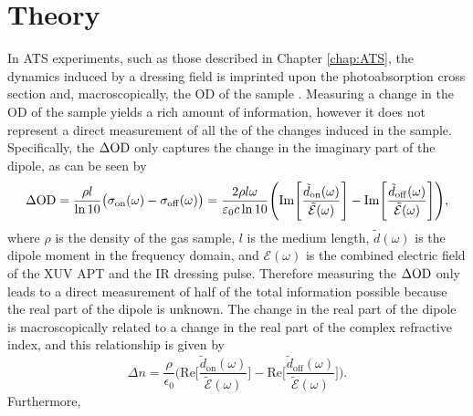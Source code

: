 \section{Theory}
\label{sec:ats_theory}
In ATS experiments, such as those described in Chapter \ref{chap:ATS}, the dynamics induced by a dressing field is imprinted upon the photoabsorption cross section and, macroscopically, the OD of the sample \cite{wuTheoryStrongfieldAttosecond2016,geneauxromainTransientAbsorptionSpectroscopy2019}.  Measuring a change in the OD of the sample yields a rich amount of information, however it does not represent a direct measurement of all the of the changes induced in the sample.  Specifically, the $\Delta\mathrm{OD}$ only captures the change in the imaginary part of the dipole, as can be seen by
\begin{equation}
	\label{eqn:dod_im_dipole}
	\Delta\mathrm{OD} = \frac{\rho l}{\ln 10}\big(\sigma_{\mathrm{on}}(\omega) - \sigma_{\mathrm{off}}(\omega)\big) = \frac{2\rho l \omega}{\varepsilon_{0} c \ln 10}\Bigg( \mathrm{Im}\Bigg[\frac{\tilde{d}_{\mathrm{on}}(\omega)}{\tilde{\mathcal{E}}(\omega)}\Bigg] - \mathrm{Im}\Bigg[\frac{\tilde{d}_{\mathrm{off}}(\omega)}{\tilde{\mathcal{E}}(\omega)}\Bigg] \Bigg),
\end{equation}
where $\rho$ is the density of the gas sample, $l$ is the medium length, $\tilde{d}(\omega)$ is the dipole moment in the frequency domain, and $\mathcal{E}(\omega)$ is the combined electric field of the XUV APT and the IR dressing pulse. Therefore measuring the $\Delta\mathrm{OD}$ only leads to a direct measurement of half of the total information possible because the real part of the dipole is unknown.  The change in the real part of the dipole is macroscopically related to a change in the real part of the complex refractive index, and this relationship is given by 
\begin{equation}
	\label{eqn:dn_re_dipole}
	\Delta n  = \frac{\rho}{\epsilon_{0}} \Bigg( \mathrm{Re}\Bigg[\frac{\tilde{d}_{\mathrm{on}}(\omega)}{\tilde{\mathcal{E}}(\omega)}\Bigg] - \mathrm{Re}\Bigg[\frac{\tilde{d}_{\mathrm{off}}(\omega)}{\tilde{\mathcal{E}}(\omega)}\Bigg] \Bigg).
\end{equation}
Furthermore,

